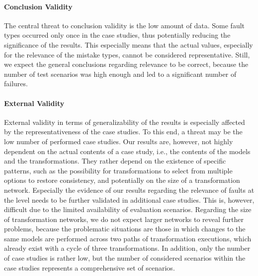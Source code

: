 \paragraph{Conclusion Validity}
The central threat to conclusion validity is the low amount of data.
Some fault types occurred only once in the case studies, thus potentially reducing the significance of the results.
This especially means that the actual values, especially for the relevance of the mistake types, cannot be considered representative.
Still, we expect the general conclusions regarding relevance to be correct, because the number of test scenarios was high enough and led to a significant number of failures.



\paragraph{External Validity}
\label{chap:correctness_evaluation:categorization:discussion:limitations}

External validity in terms of generalizability of the results is especially affected by the representativeness of the case studies.
To this end, a threat may be the low number of performed case studies.
Our results are, however, not highly dependent on the actual contents of a case study, i.e., the contents of the models and the transformations.
They rather depend on the existence of specific patterns, such as the possibility for transformations to select from multiple options to restore consistency, and potentially on the size of a transformation network.
Especially the evidence of our results regarding the relevance of faults at the \levelnetworkrule level needs to be further validated in additional case studies.
This is, however, difficult due to the limited availability of evaluation scenarios.
Regarding the size of transformation networks, we do not expect larger networks to reveal further problems, because the problematic situations are those in which changes to the same models are performed across two paths of transformation executions, which already exist with a cycle of three transformations.
In addition, only the number of case studies is rather low, but the number of considered scenarios within the case studies represents a comprehensive set of scenarios.

